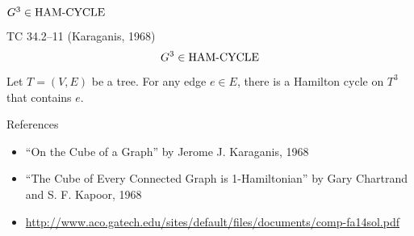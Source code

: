 \begin{frame}{$G^3 \in \text{HAM-CYCLE}$}
  \begin{exampleblock}{TC 34.2--11 (Karaganis, 1968)}
	\[
	  G^3 \in \text{HAM-CYCLE}
	\]
  \end{exampleblock}

  \begin{theorem}{}
	Let $T = (V, E)$ be a tree. For any edge $e \in E$, there is a Hamilton cycle on $T^3$ that contains $e$.
  \end{theorem}

  \begin{alertblock}{References}
	\begin{itemize}
	  \item ``On the Cube of a Graph'' by Jerome J. Karaganis, 1968
	  \item ``The Cube of Every Connected Graph is 1-Hamiltonian'' by Gary Chartrand and S. F. Kapoor, 1968
	  \item \url{http://www.aco.gatech.edu/sites/default/files/documents/comp-fa14sol.pdf}
	  \end{itemize}
  \end{alertblock}
\end{frame}
